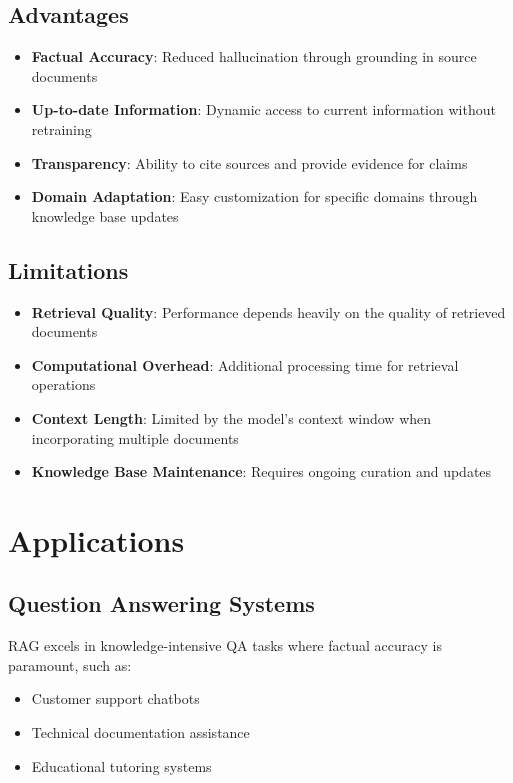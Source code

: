 \documentclass[]{article}
\begin{document}
\subsection{Advantages}
\begin{itemize}
    \item \textbf{Factual Accuracy}: Reduced hallucination through grounding in source documents
    \item \textbf{Up-to-date Information}: Dynamic access to current information without retraining
    \item \textbf{Transparency}: Ability to cite sources and provide evidence for claims
    \item \textbf{Domain Adaptation}: Easy customization for specific domains through knowledge base updates
\end{itemize}

\subsection{Limitations}
\begin{itemize}
    \item \textbf{Retrieval Quality}: Performance depends heavily on the quality of retrieved documents
    \item \textbf{Computational Overhead}: Additional processing time for retrieval operations
    \item \textbf{Context Length}: Limited by the model's context window when incorporating multiple documents
    \item \textbf{Knowledge Base Maintenance}: Requires ongoing curation and updates
\end{itemize}

\section{Applications}

\subsection{Question Answering Systems}
RAG excels in knowledge-intensive QA tasks where factual accuracy is paramount, such as:
\begin{itemize}
    \item Customer support chatbots
    \item Technical documentation assistance
    \item Educational tutoring systems
\end{itemize}
\end{document}
